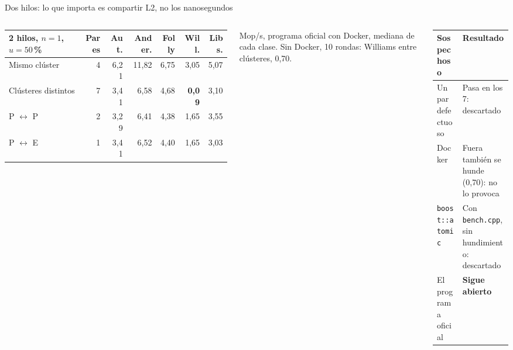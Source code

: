 \begin{frame}{Dos hilos: lo que importa es compartir L2, no los nanosegundos}
  \begin{columns}[T]
    \scriptsize\renewcommand{\arraystretch}{1.12}
    \begin{tabular}{@{}lrrrrrr@{}}
      \toprule
      \textbf{2 hilos}, $n = 1$, $u = 50$\,\% & \textbf{Pares} & \textbf{Aut.} & \textbf{Ander.} & \textbf{Folly} & \textbf{Will.} & \textbf{Libs.}\\
      \midrule
      Mismo clúster & 4 & 6,21 & 11,82 & 6,75 & 3,05 & 5,07\\
      Clústeres distintos & 7 & 3,41 & 6,58 & 4,68 & \textcolor{rojo}{\textbf{0,09}} & 3,10\\
      P $\leftrightarrow$ P & 2 & 3,29 & 6,41 & 4,38 & 1,65 & 3,55\\
      P $\leftrightarrow$ E & 1 & 3,41 & 6,52 & 4,40 & 1,65 & 3,03\\
      \bottomrule
    \end{tabular}
    \par\smallskip\scriptsize Mop/s, programa oficial con Docker, mediana de cada clase. Sin Docker, 10 rondas: Williams entre clústeres, 0,70.
    \par\medskip
    \footnotesize\renewcommand{\arraystretch}{1.1}
    \begin{tabularx}{\linewidth}{@{}p{0.34\linewidth}X@{}}
      \toprule
      \textbf{Sospechoso} & \textbf{Resultado}\\
      \midrule
      Un par defectuoso & Pasa en los 7: descartado\\
      Docker & Fuera también se hunde (0,70): no lo provoca\\
      \texttt{boost::atomic} & Con \texttt{bench.cpp}, sin hundimiento: descartado\\
      El programa oficial & \textbf{Sigue abierto}\\
      \bottomrule
    \end{tabularx}
  \end{columns}
\end{frame}

